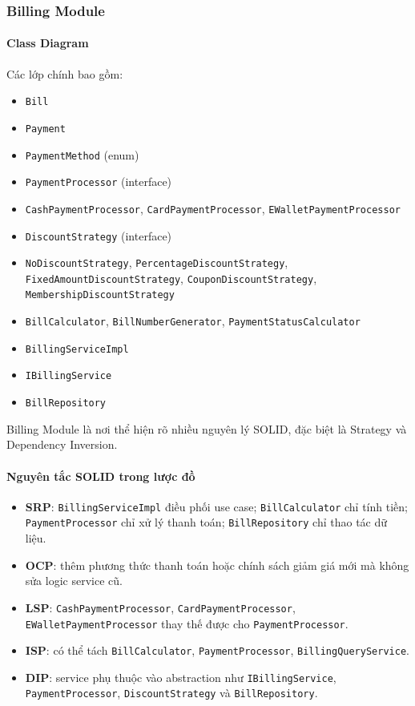\documentclass[12pt,a4paper]{article}
\begin{document}
\subsubsection{Billing Module}

\paragraph{Class Diagram}
Các lớp chính bao gồm:
\begin{itemize}
    \item \texttt{Bill}
    \item \texttt{Payment}
    \item \texttt{PaymentMethod} (enum)
    \item \texttt{PaymentProcessor} (interface)
    \item \texttt{CashPaymentProcessor}, \texttt{CardPaymentProcessor}, \texttt{EWalletPaymentProcessor}
    \item \texttt{DiscountStrategy} (interface)
    \item \texttt{NoDiscountStrategy}, \texttt{PercentageDiscountStrategy}, \texttt{FixedAmountDiscountStrategy}, \texttt{CouponDiscountStrategy}, \texttt{MembershipDiscountStrategy}
    \item \texttt{BillCalculator}, \texttt{BillNumberGenerator}, \texttt{PaymentStatusCalculator}
    \item \texttt{BillingServiceImpl}
    \item \texttt{IBillingService}
    \item \texttt{BillRepository}
\end{itemize}

Billing Module là nơi thể hiện rõ nhiều nguyên lý SOLID, đặc biệt là Strategy và Dependency Inversion.

\paragraph{Nguyên tắc SOLID trong lược đồ}
\begin{itemize}
    \item \textbf{SRP}: \texttt{BillingServiceImpl} điều phối use case; \texttt{BillCalculator} chỉ tính tiền; \texttt{PaymentProcessor} chỉ xử lý thanh toán; \texttt{BillRepository} chỉ thao tác dữ liệu.
    \item \textbf{OCP}: thêm phương thức thanh toán hoặc chính sách giảm giá mới mà không sửa logic service cũ.
    \item \textbf{LSP}: \texttt{CashPaymentProcessor}, \texttt{CardPaymentProcessor}, \texttt{EWalletPaymentProcessor} thay thế được cho \texttt{PaymentProcessor}.
    \item \textbf{ISP}: có thể tách \texttt{BillCalculator}, \texttt{PaymentProcessor}, \texttt{BillingQueryService}.
    \item \textbf{DIP}: service phụ thuộc vào abstraction như \texttt{IBillingService}, \texttt{PaymentProcessor}, \texttt{DiscountStrategy} và \texttt{BillRepository}.
\end{itemize}
\end{document}
